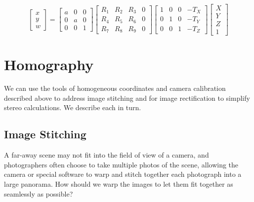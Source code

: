 \begin{equation}
        \left [
    \begin{array}{c}
    x \\
    y \\
    w
    \end{array}
    \right ] 
=
 \left [
    \begin{array}{ccc}
    a & 0 & 0  \\
    0 & a & 0  \\
    0 & 0 & 1 
    \end{array}
    \right ]
     \left [
    \begin{array}{cccc}
    R_1 & R_2 & R_3  & 0 \\
    R_4 & R_5 & R_6 & 0 \\
    R_7 & R_8 & R_9 & 0
    \end{array}
    \right ]
     \left [
    \begin{array}{cccc}
    1 & 0 & 0 & -T_X \\
    0 & 1 & 0 & -T_Y \\
    0 & 0 & 1 & -T_Z
    \end{array}
    \right ]
        \left [
    \begin{array}{c}
    X \\
    Y \\
    Z \\
    1
    \end{array}
    \right ] 
    \label{eq:combinedexpandedsmaller}
\end{equation}

\section{Homography}

We can use the tools of homogeneous coordinates and camera calibration described above to address image stitching and for image rectification to simplify stereo calculations. We describe each in turn.

\subsection{Image Stitching}
A far-away scene may not fit into the field of view of a camera, and photographers often choose to take multiple photos of the scene, allowing the camera or special software to warp and stitch together each photograph into a large panorama.  How should we warp the images to let them fit together as seamlessly as possible?

